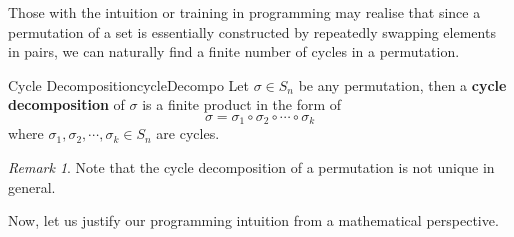 \documentclass[math]{amznotes}
\theoremstyle{remark}
\newtheorem*{remark}{Remark}
\newcommand{\0}{\mathbf{0}}
\newcommand{\1}{\mathbf{1}}
\begin{document}
Those with the intuition or training in programming may realise that since a permutation of a set is essentially constructed by repeatedly swapping elements in pairs, we can naturally find a finite number of cycles in a permutation.
\begin{dfnbox}{Cycle Decomposition}{cycleDecompo}
    Let $\sigma \in S_n$ be any permutation, then a {\color{red} \textbf{cycle decomposition}} of $\sigma$ is a finite product in the form of
    \begin{equation*}
        \sigma = \sigma_1 \circ \sigma_2 \circ \cdots \circ \sigma_k
    \end{equation*}
    where $\sigma_1, \sigma_2, \cdots, \sigma_k \in S_n$ are cycles.
\end{dfnbox}
\begin{notebox}
    \begin{remark}
        Note that the cycle decomposition of a permutation is not unique in general.
    \end{remark}
\end{notebox}
Now, let us justify our programming intuition from a mathematical perspective.
\end{document}
